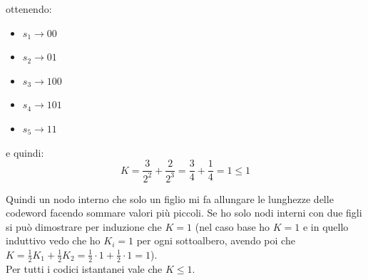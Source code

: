 \documentclass[a4paper,12pt, oneside]{book}
\begin{document}
\begin{esempio}
\begin{figure}[H]
  \end{figure}
  ottenendo:
  \begin{itemize}
    \item $s_1\to 00$
    \item $s_2\to 01$
    \item $s_3\to 100$
    \item $s_4\to 101$
    \item $s_5\to 11$
  \end{itemize}
  e quindi:
  \[K=\frac{3}{2^2}+\frac{2}{2^3}=\frac{3}{4}+\frac{1}{4}=1\leq 1\]
\end{esempio}
Quindi un nodo interno che solo un figlio mi fa allungare le lunghezze delle
codeword facendo sommare valori più piccoli. Se ho solo nodi interni con due
figli si può dimostrare per induzione che $K=1$ (nel caso base ho $K=1$ e in
quello induttivo vedo che ho $K_i=1$ per ogni sottoalbero, avendo poi che
$K=\frac{1}{2}K_1+\frac{1}{2}K_2=\frac{1}{2}\cdot 1+\frac{1}{2}\cdot 1= 1$).\\
Per tutti i codici istantanei vale che $K\leq 1$.
\end{document}
